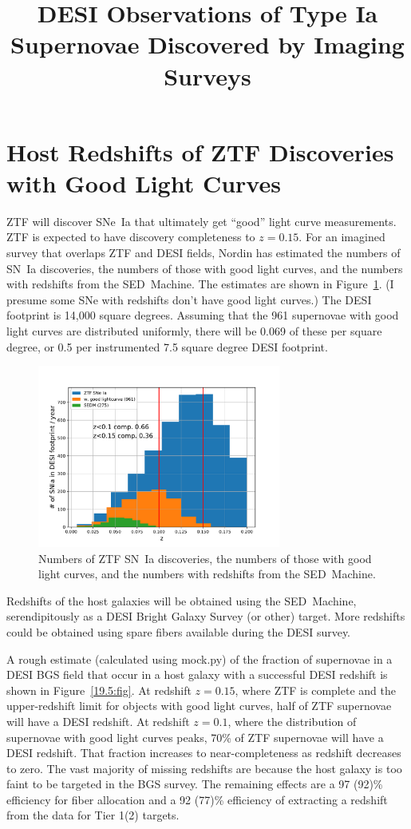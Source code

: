 \documentclass{article}   	%
\title{DESI Observations of Type Ia Supernovae Discovered by Imaging Surveys}
\begin{document}
\maketitle

\section{Host Redshifts of ZTF Discoveries with Good Light Curves}
ZTF will discover SNe~Ia that ultimately get ``good'' light curve measurements.  ZTF is expected to have discovery completeness to $z=0.15$.
For an imagined survey that overlaps ZTF and DESI fields, Nordin has estimated the
numbers of SN~Ia discoveries, the numbers of those with good light curves, and the numbers with redshifts from the SED~Machine.
The estimates are shown in Figure~\ref{ZTFnum:fig}.  (I presume some SNe with redshifts don't have good light curves.) 
The DESI footprint
is 14,000 square degrees.  Assuming that the 961 supernovae with good light curves are distributed uniformly, there will be 0.069
of these per square degree, or 0.5 per instrumented 7.5 square degree  DESI footprint.


\begin{figure}[h]
\includegraphics[width=8cm]{zdist_12m_185_195.pdf}
\centering
\caption{Numbers of ZTF SN~Ia discoveries, the numbers of those with good light curves, and the numbers with redshifts from the SED~Machine.
\label{ZTFnum:fig}}
\end{figure}

Redshifts of the host galaxies will be obtained using the SED~Machine, serendipitously as a DESI Bright Galaxy Survey (or other) target.
More redshifts could be obtained using spare fibers available during the DESI survey.

A rough estimate (calculated
using mock.py)
of the fraction of supernovae in a DESI BGS field 
that occur in a host galaxy with a successful DESI redshift is shown in Figure~\ref{19.5:fig}.
At redshift $z=0.15$, where ZTF is complete and the upper-redshift limit for objects with good light curves, half of ZTF supernovae will have a DESI redshift.
At redshift $z=0.1$, where the distribution of supernovae with good light curves peaks, 70\% of ZTF supernovae will have a DESI redshift.
That fraction increases to near-completeness as redshift decreases to zero.
The vast majority of missing redshifts are
because the host galaxy is too faint to be targeted in the BGS survey.
The remaining effects are
a 97 (92)\% efficiency for fiber allocation and a 92 (77)\% efficiency of extracting a redshift from the data for Tier 1(2) targets. 
\end{document}
